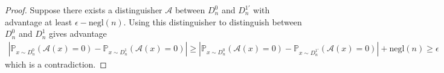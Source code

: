 \documentclass[10pt,a4paper]{amsart}
\newcommand{\Abs}[1]{\left\lvert#1\right\rvert}
\newcommand{\Paren}[1]{\left(#1\right)}
\newcommand{\Psymb}{\mathbb{P}}
\newcommand{\cA}{\mathcal A}
\newcommand{\e}{\epsilon}
\renewcommand{\geq}{\geqslant}
\newcommand{\negl}{\mathrm{negl}}
\begin{document}
\begin{proof}
    Suppose there exists a distinguisher $\cA$ between $D_n^0$ and $D_n^{1'}$ with advantage at least $\e - \negl(n)$.
    Using this distinguisher to distinguish between $D_n^0$ and $D_n^1$ gives advantage
    \begin{align*}
        \Abs{\Psymb_{x \sim D_n^0} \Paren{\cA(x) = 0} - \Psymb_{x \sim D_n^1} \Paren{\cA(x) = 0}} \geq \Abs{\Psymb_{x \sim D_n^0} \Paren{\cA(x) = 0} - \Psymb_{x \sim D_n^{1'}} \Paren{\cA(x) = 0}} + \negl(n) \geq \e
    \end{align*}
    which is a contradiction.
\end{proof}
\end{document}
